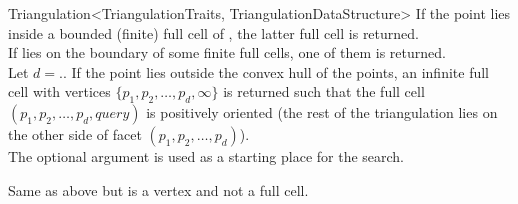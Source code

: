 \begin{ccRefClass}{Triangulation<TriangulationTraits, TriangulationDataStructure>}
{If the point  lies inside a bounded (finite) full cell of \ccVar,
the latter full cell is returned.\\
If  lies on the boundary of some finite full cells, one of them
is returned.\\
Let $d=$\ccVar.. If the point  lies
outside the convex hull of the points, an infinite full cell with vertices $\{
p_1, p_2, \ldots, p_d, \infty\}$ is returned such that the full cell $(p_1, p_2,
\ldots, p_d, query)$ is positively oriented (the rest of the triangulation lies
on the other side of facet $(p_1, p_2, \ldots, p_d)$).\\
The optional argument  is used as a starting place for the search.}

{Same as above but  is a vertex and not a full cell.}


\end{ccRefClass}
